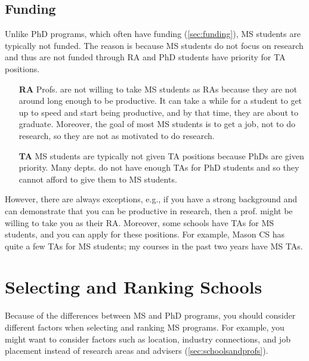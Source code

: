 \documentclass[oneside,11pt,dvipsnames]{book}
\def\sectioninfo#1{%
  \addcontentsline{toc}{sectioninfo}{%
    \noexpand\numberline{}\color{black}{#1}}%
}
\begin{document}
\subsection{Funding}\label{sec:ms-funding}
Unlike PhD programs, which often have funding (\autoref{sec:funding}), MS students are typically not funded. The reason is because MS students do not focus on research and thus are not funded through RA and PhD students have priority for TA positions. 
\begin{itemize}
\item[\textbf{RA}] Profs. are not willing to take MS students as RAs because they are not around long enough to be productive. It can take a while for a student to get up to speed and start being productive, and by that time, they are about to graduate. Moreover, the goal of most MS students is to get a job, not to do research, so they are not as motivated to do research.

\item[\textbf{TA}] MS students are typically not given TA positions because PhDs are given priority. Many depts. do not have enough TAs for PhD students and so they cannot afford to give them to MS students.
\end{itemize}

However, there are always exceptions, e.g., if you have a strong background and can demonstrate that you can be productive in research, then a prof. might be willing to take you as their RA.
Moreover, some schools have TAs for MS students, and you can apply for these positions. For example, Mason CS has quite a few TAs for MS students; my courses in the past two years have MS TAs.

\section{Selecting and Ranking Schools}\label{sec:selecting-ranking-schools-ms}

Because of the differences between MS and PhD programs, you should consider different factors when selecting and ranking MS programs. For example, you might want to consider factors such as location, industry connections, and job placement instead of research areas and advisers (\autoref{sec:schoolsandprofs}).
\end{document}
